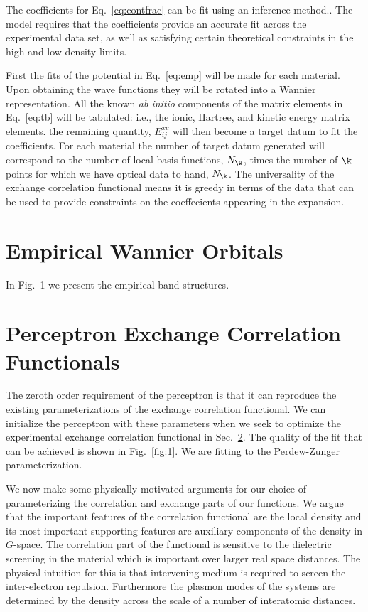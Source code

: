 The coefficients for Eq.~\ref{eq:contfrac} can be fit using an inference method.. 
The model requires that the coefficients provide an accurate fit 
across the experimental data set, as well as satisfying certain theoretical constraints in the high and low density limits.

First the fits of the potential in Eq.~\ref{eq:emp} will be made for each material. Upon obtaining the wave functions
they will be rotated into a Wannier representation. All the known {\it ab initio} components of the matrix elements
in Eq.~\ref{eq:tb} will be tabulated: i.e., the ionic, Hartree, and kinetic energy matrix elements. the remaining quantity,
$E^{xc}_{ij}$ will then become a target datum to fit the coefficients. For each material the number of target datum
generated will correspond to the number of local basis functions, $N_{\w}$, times the number of $\k$-points for which
we have optical data to hand, $N_{\k}$. The universality of the exchange correlation functional means it is greedy in
terms of the data that can be used to provide constraints on the coeffecients appearing in the expansion.

\section{Empirical Wannier Orbitals}
In Fig.~1 we present the empirical band structures.

\section{Perceptron Exchange Correlation Functionals}
\label{sec:bayesvxc}
The zeroth order requirement of the perceptron is that it can reproduce the existing parameterizations
of the exchange correlation functional. We can initialize the perceptron with these parameters when
we seek to optimize the experimental exchange correlation functional in Sec.~\ref{sec:bayesvxc}.
The quality of the fit that can be achieved is shown in Fig.~\ref{fig:1}. We are fitting to the 
Perdew-Zunger parameterization.

We now make some physically motivated arguments for our choice of parameterizing the
correlation and exchange parts of our functions. We argue that the important features of
the correlation functional are the local density and its most important supporting features
are auxiliary components of the density in $G$-space. The correlation part of the functional 
is sensitive to the dielectric screening in the material which is important over larger 
real space distances. The physical intuition for this is that intervening medium is required 
to screen the inter-electron repulsion. Furthermore the plasmon modes of the systems 
are determined by the density across the scale of a number of interatomic distances. 

